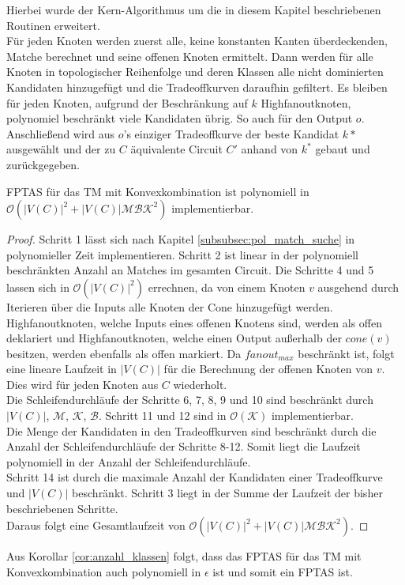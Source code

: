 \documentclass[11pt, a4paper, german]{article}
\begin{document}
Hierbei wurde der Kern-Algorithmus um die in diesem Kapitel beschriebenen Routinen erweitert. \\
Für jeden Knoten werden zuerst alle, keine konstanten Kanten überdeckenden, Matche berechnet und seine offenen Knoten ermittelt. Dann werden für alle Knoten in topologischer Reihenfolge und deren Klassen alle nicht dominierten Kandidaten hinzugefügt und die Tradeoffkurven daraufhin gefiltert. Es bleiben für jeden Knoten, aufgrund der Beschränkung auf $k$ Highfanoutknoten, polynomiel beschränkt viele Kandidaten übrig. So auch für den Output $o$. Anschließend wird aus $o$'s einziger Tradeoffkurve der beste Kandidat $k*$ ausgewählt und der zu $C$ äquivalente Circuit $C'$ anhand von $k^*$ gebaut und zurückgegeben.

\begin{lemma}
	FPTAS für das TM mit Konvexkombination ist polynomiell in $\mathcal{O}(|V(C)|^2 + |V(C)|\mathcal{MBK}^2)$ implementierbar.
\end{lemma}
\begin{proof}
Schritt 1 lässt sich nach Kapitel \ref{subsubsec:pol_match_suche} in polynomieller Zeit implementieren. Schritt 2 ist linear in der polynomiell beschränkten Anzahl an Matches im gesamten Circuit.  Die Schritte 4 und  5 lassen sich in $\mathcal{O}(|V(C)|^2)$ errechnen, da von einem Knoten $v$ ausgehend durch Iterieren über die Inputs alle Knoten der Cone hinzugefügt werden.  Highfanoutknoten, welche Inputs eines offenen Knotens sind, werden als offen deklariert und Highfanoutknoten, welche einen Output außerhalb der $cone(v)$ besitzen, werden ebenfalls als offen markiert. Da $fanout_{max}$ beschränkt ist, folgt eine lineare Laufzeit in $|V(C)|$ für die Berechnung der offenen Knoten von $v$. Dies wird für jeden Knoten aus $C$ wiederholt. \\
Die  Schleifendurchläufe der Schritte 6, 7, 8, 9  und 10 sind beschränkt durch $|V(C)|$, $\mathcal{M}$,  $\mathcal{K}$, $\mathcal{B}$. Schritt 11 und 12 sind in $\mathcal{O}(\mathcal{K})$ implementierbar.\\
Die Menge der Kandidaten in den Tradeoffkurven sind beschränkt durch die Anzahl der Schleifendurchläufe der Schritte 8-12.  Somit liegt die Laufzeit polynomiell in der Anzahl der Schleifendurchläufe. \\
Schritt 14 ist durch die maximale Anzahl der Kandidaten einer Tradeoffkurve und $|V(C)|$ beschränkt. Schritt 3 liegt in der Summe der Laufzeit der bisher beschriebenen Schritte.\\
Daraus folgt eine Gesamtlaufzeit von $\mathcal{O}(|V(C)|^2 + |V(C)|\mathcal{MBK}^2)$.
\end{proof}
Aus Korollar \ref{cor:anzahl_klassen} folgt, dass das FPTAS für das TM mit Konvexkombination  auch polynomiell in $\epsilon$ ist und somit ein FPTAS ist. 
\end{document}
